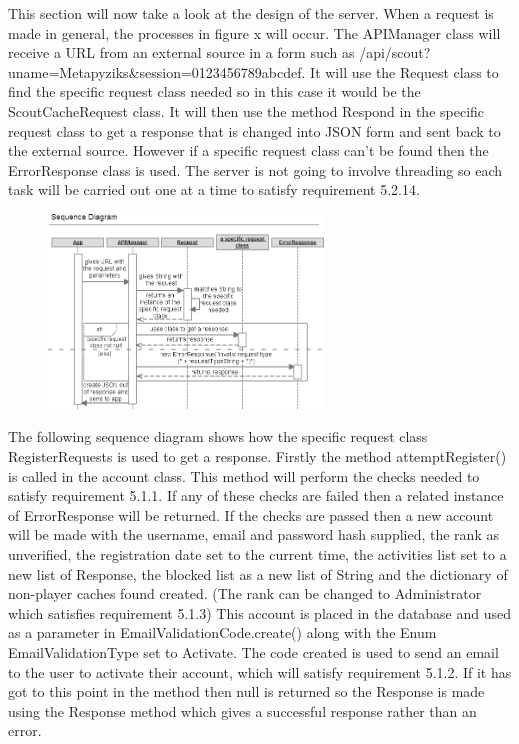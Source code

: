 This section will now take a look at the design of the server. When a request is made in general, the processes in figure x will occur. The APIManager class will receive a URL from an external source in a form such as /api/scout?uname=Metapyziks\&session=0123456789abcdef. It will use the Request class to find the specific request class needed so in this case it would be the ScoutCacheRequest class. It will then use the method Respond in the specific request class to get a response that is changed into JSON form and sent back to the external source. However if a specific request class can't be found then the ErrorResponse class is used. The server is not going to involve threading so each task will be carried out one at a time to satisfy requirement 5.2.14.

\begin{figure}
    \includegraphics[width=0.65\textwidth]{images/sequence/Servergeneral}
\end{figure}

The following sequence diagram shows how the specific request class RegisterRequests is used to get a response. Firstly the method attemptRegister() is called in the account class. This method will perform the checks needed to satisfy requirement 5.1.1. If any of these checks are failed then a related instance of ErrorResponse will be returned. If the checks are passed then a new account will be made with the username, email and password hash supplied, the rank as unverified, the registration date set to the current time, the activities list set to a new list of Response, the blocked list as a new list of String and the dictionary of non-player caches found created. (The rank can be changed to Administrator which satisfies requirement 5.1.3) This account is placed in the database and used as a parameter in EmailValidationCode.create() along with the Enum EmailValidationType set to Activate. The code created is used to send an email to the user to activate their account, which will satisfy requirement 5.1.2. If it has got to this point in the method then null is returned so the Response is made using the Response method which gives a successful response rather than an error.

